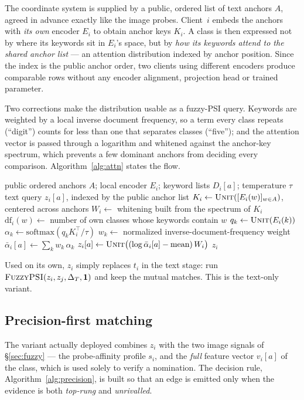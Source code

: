 \documentclass[conference]{IEEEtran}
\newcommand{\Ind}{\mathbf{1}}
\newcommand{\Unit}{\textsc{Unit}}
\newcommand{\FuzzyPSI}{\textsc{FuzzyPSI}}
\begin{document}
The coordinate system is supplied by a public, ordered list of text
anchors $A$, agreed in advance exactly like the image probes. Client~$i$
embeds the anchors with \emph{its own} encoder $E_i$ to obtain anchor
keys $K_i$. A class is then expressed not by where its keywords sit in
$E_i$'s space, but by \emph{how its keywords attend to the shared anchor
list} --- an attention distribution indexed by anchor position. Since
the index is the public anchor order, two clients using different
encoders produce comparable rows without any encoder alignment,
projection head or trained parameter.

Two corrections make the distribution usable as a fuzzy-PSI query.
Keywords are weighted by a local inverse document frequency, so a term
every class repeats (``digit'') counts for less than one that separates
classes (``five''); and the attention vector is passed through a
logarithm and whitened against the anchor-key spectrum, which prevents a
few dominant anchors from deciding every comparison.
Algorithm~\ref{alg:attn} states the flow.

\begin{algorithm}[t]
\caption{Keyword-attention coordinates (per client)}
\label{alg:attn}
\begin{algorithmic}[1]
\Require public ordered anchors $A$; local encoder $E_i$; keyword lists $D_i[a]$; temperature $\tau$
\Ensure text query $z_i[a]$, indexed by the public anchor list
  \State $K_i\gets\Unit([E_i(w)]_{w\in A})$, centered across anchors
  \State $W_i\gets$ whitening built from the spectrum of $K_i$
  \State $\mathrm{df}_i(w)\gets$ number of own classes whose keywords contain $w$
      \State $q_k\gets\Unit(E_i(k))$ 
      \State $\alpha_k\gets\mathrm{softmax}(q_k K_i^{\!\top}/\tau)$ 
      \State $w_k\gets$ normalized inverse-document-frequency weight
    \EndFor
    \State $\bar\alpha_i[a]\gets\sum_k w_k\,\alpha_k$
    \State $z_i[a]\gets\Unit\big((\log\bar\alpha_i[a]-\text{mean})\,W_i\big)$
  \EndFor
  \State \Return $z_i$
\end{algorithmic}
\end{algorithm}

Used on its own, $z_i$ simply replaces $t_i$ in the text stage: run
$\FuzzyPSI(z_i,z_j,\Delta_T,\Ind)$ and keep the mutual matches. This is
the text-only variant.

\subsection{Precision-first matching}
\label{sec:precision}
The variant actually deployed combines $z_i$ with the two image signals
of \S\ref{sec:fuzzy} --- the probe-affinity profile $s_i$, and the
\emph{full} feature vector $v_i[a]$ of the class, which is used solely
to verify a nomination. The decision rule, Algorithm~\ref{alg:precision},
is built so that an edge is emitted only when the evidence is both
\emph{top-rung} and \emph{unrivalled}.
\end{document}
